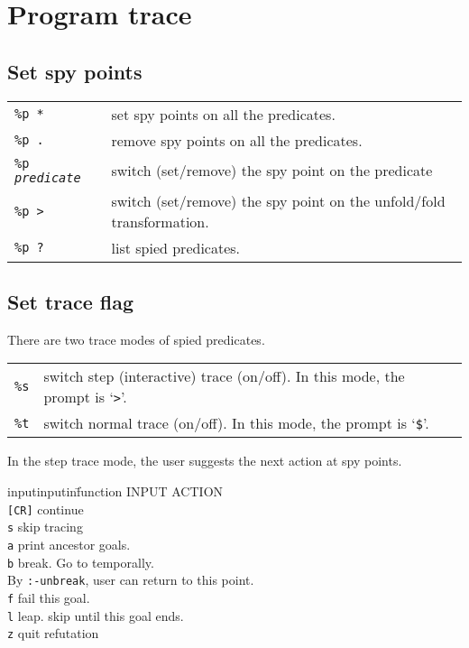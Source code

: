 \section{Program trace}

\subsection{Set spy points}
\begin{tabular}{ll}
{\tt \%p *} & set spy points on all the predicates. \\
{\tt \%p .} & remove spy points on all the predicates. \\
{\tt \%p {\em predicate}} & 
	switch (set/remove) the spy point on the predicate\\
{\tt \%p > } & switch (set/remove) the spy point on the unfold/fold transformation.\\
{\tt \%p ?} & list spied predicates.
\end{tabular}

\subsection{Set trace flag}
There are two trace modes of spied predicates.

\begin{tabular}{ll}
{\tt \%s} & switch step (interactive) trace (on/off). 
In this mode, the prompt is `\verb+>+'.\\
{\tt \%t} & switch normal trace (on/off). 
In this mode, the prompt is  `\verb+$+'.
\end{tabular}

In the step trace mode, the user suggests the next action at spy points.
\begin{tabbing}
inputinputin\=function \kill
INPUT \> ACTION\\
{\tt [CR]} \> continue\\
{\tt s} \> skip tracing\\
{\tt a}	\> print ancestor goals.\\
{\tt b} \> break. Go to \cuprolog temporally.\\
	\> By {\tt :-unbreak}, user can return to this point.\\
{\tt f} \> fail this goal.\\
{\tt l} \> leap. skip until this goal ends.\\
{\tt z} \> quit refutation
\end{tabbing}

